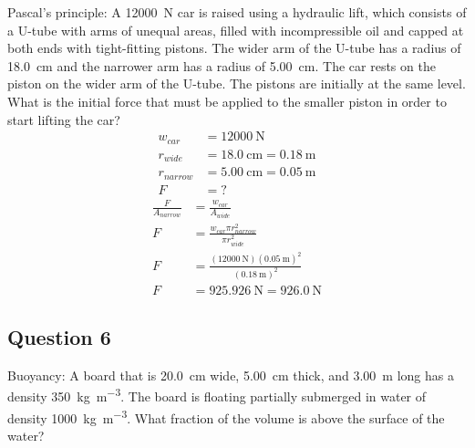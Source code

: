 \documentclass{article}
\begin{document}
Pascal's principle: A \SI{12000}{\newton} car is raised using a hydraulic lift, which consists of a U-tube with arms of unequal areas, filled with incompressible oil and capped at both ends with tight-fitting pistons. The wider arm of the U-tube has a radius of \SI{18.0}{\centi \meter} and the narrower arm has a radius of \SI{5.00}{\centi \meter}. The car rests on the piston on the wider arm of the U-tube. The pistons are initially at the same level. What is the initial force that must be applied to the smaller piston in order to start lifting the car?
\begin{align*}
	w_{car} & = \SI{12000}{\newton} \\
	r_{wide} & = \SI{18.0}{\centi \meter} = \SI{0.18}{\meter} \\
	r_{narrow} & = \SI{5.00}{\centi \meter} = \SI{0.05}{\meter} \\
	F & = ?
\end{align*}
\begin{align*}
	\frac{ F }{ A_{narrow} } & = \frac{ w_{car} }{ A_{wide} } \\
	F & = \frac{ w_{car}\pi r_{narrow}^2 }{ \pi r_{wide}^2 } \\
	F & = \frac{ (\SI{12000}{\newton})(\SI{0.05}{\meter})^2 }{ (\SI{0.18}{\meter})^2 } \\
	F & = \SI{925.926}{\newton} = \SI{926.0}{\newton}
\end{align*}

\subsection{Question 6}

Buoyancy: A board that is \SI{20.0}{\centi \meter} wide, \SI{5.00}{\centi \meter} thick, and \SI{3.00}{\meter} long has a density \SI{350}{\kilogram \per \meter \cubed}. The board is floating partially submerged in water of density \SI{1000}{\kilogram \per \meter \cubed}. What fraction of the volume is above the surface of the water?
\begin{align*}
\end{align*}
\end{document}
